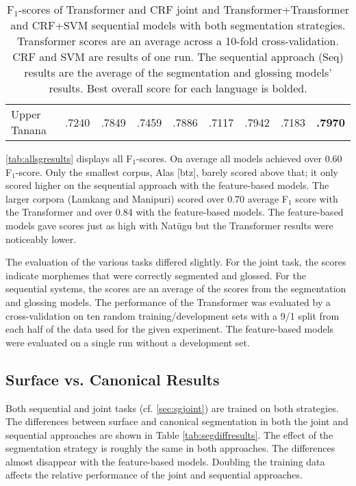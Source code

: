 \begin{table}[!tb]
\begin{tabular}{l|cc|cc|cc|cc}
         \hline
         Upper Tanana & .7240 & .7849 & .7459 & .7886
                      & .7117 & .7942 & .7183 & \textbf{.7970} \\
    \end{tabular}
    \caption[Results of All Segmentation and Glossing Models]{F$_1$-scores of Transformer and CRF joint and Transformer+Transformer and CRF+SVM sequential models with both segmentation strategies. Transformer scores are an average across a 10-fold cross-validation. CRF and SVM are results of one run. The sequential approach (Seq) results are the average of the segmentation and glossing models' results. Best overall score for each language is bolded.}
    \label{tab:allsgresults}
\end{table}


\autoref{tab:allsgresults} displays all F$_1$-scores. On average all models achieved over 0.60 F$_1$-score. Only the smallest corpus, Alas [btz], barely scored above that; it only scored higher on the sequential approach with the feature-based models. The larger corpora (Lamkang and Manipuri) scored over 0.70 average F$_1$ score with the Transformer and over 0.84 with the feature-based models. The feature-based models gave scores just as high with Nat\"ugu but the Transformer results were noticeably lower.

The evaluation of the various tasks differed slightly. For the joint task, the scores indicate morphemes that were correctly segmented and glossed. For the sequential systems, the scores are an average of the scores from the segmentation and glossing models. The performance of the Transformer was evaluated by a cross-validation on ten random training/development sets with a 9/1 split from each half of the data used for the given experiment. The feature-based models were evaluated on a single run without a development set. 


\subsection{Surface vs. Canonical Results}

Both sequential and joint tasks (cf. \autoref{sec:sgjoint}) are trained on both strategies. The differences between surface and canonical segmentation in both the joint and sequential approaches are shown in Table \ref{tab:segdiffresults}. The effect of the segmentation strategy is roughly the same in both approaches. The differences almost disappear with the feature-based models. Doubling the training data affects the relative performance of the joint and sequential approaches.


